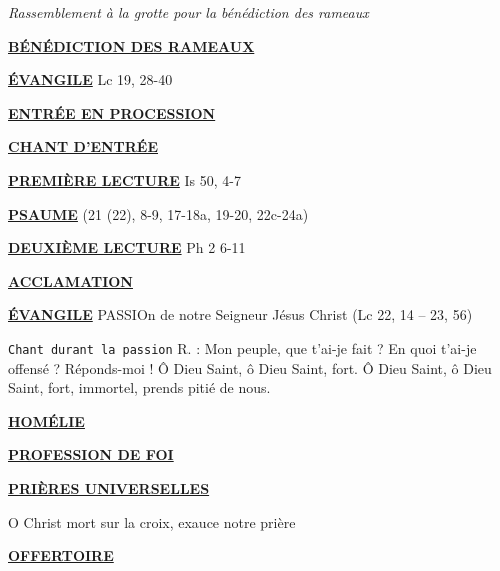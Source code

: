 \documentclass[11pt,a4paper]{article}
\newcommand{\SepRule}{\noindent							 %
						\begin{center}
							\rule{250pt}{1pt}
						\end{center}
						}
\newcommand{\NewsItem}[1]{%
\vspace{3pt}
\underline{\textbf{#1}}
		  }
\begin{document}





\textit{Rassemblement à la grotte pour la bénédiction des rameaux}

\NewsItem{BÉNÉDICTION DES RAMEAUX}

	

\NewsItem{ÉVANGILE} Lc 19, 28-40

\NewsItem{ENTRÉE EN PROCESSION}

\NewsItem{CHANT D'ENTRÉE}
	


\NewsItem{PREMIÈRE LECTURE} Is 50, 4-7

\NewsItem{PSAUME} (21 (22), 8-9, 17-18a, 19-20, 22c-24a)


\NewsItem{DEUXIÈME LECTURE} Ph 2 6-11

\NewsItem{ACCLAMATION}
	

\NewsItem{ÉVANGILE} PASSIOn de notre Seigneur Jésus Christ (Lc 22, 14 – 23, 56)

\texttt{Chant durant la passion}  R. : Mon peuple, que t'ai-je fait ? En quoi
t'ai-je offensé ? Réponds-moi ! Ô Dieu Saint, ô Dieu Saint, fort.
Ô Dieu Saint, ô Dieu Saint, fort, immortel, prends pitié de nous.


\NewsItem{HOMÉLIE}

\NewsItem{PROFESSION DE FOI} 


\NewsItem{PRIÈRES UNIVERSELLES} 
O Christ mort sur la croix, exauce notre prière

\NewsItem{OFFERTOIRE} 
\end{document}

